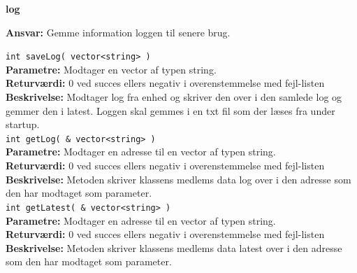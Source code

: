 {\centering
\textbf{log}\par
}
\textbf{Ansvar:} Gemme information loggen til senere brug. \

\verb+int saveLog( vector<string> ) +\\
\textbf{Parametre:} Modtager en vector af typen string. \\
\textbf{Returværdi:} 0 ved succes ellers negativ i overenstemmelse med fejl-listen \\
\textbf{Beskrivelse:} Modtager log fra enhed og skriver den over i den samlede log og gemmer den i latest. Loggen skal gemmes i en txt fil som der læses fra under startup. \\

\verb+int getLog( & vector<string> ) + \\
\textbf{Parametre:} Modtager en adresse til en vector af typen string. \\
\textbf{Returværdi:} 0 ved succes ellers negativ i overenstemmelse med fejl-listen \\
\textbf{Beskrivelse:} Metoden skriver klassens medlems data log over i den adresse som den har modtaget som parameter.\\

\verb+int getLatest( & vector<string> ) +\\
\textbf{Parametre:} Modtager en adresse til en vector af typen string.  \\
\textbf{Returværdi:} 0 ved succes ellers negativ i overenstemmelse med fejl-listen \\
\textbf{Beskrivelse:} Metoden skriver klassens medlems data latest over i den adresse som den har modtaget som parameter.\\


